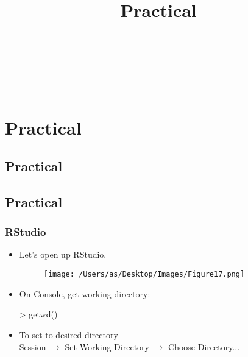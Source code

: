 \documentclass[11pt]{beamer}
\newcommand{\docYear}{\text{2022}} %
\newcommand{\aUthor}{\text{Anjali Silva}}
\newcommand{\courseCodeName}{\text{BCB410H1: Applied Bioinformatics }}
\begin{document}
\begin{frame}
\titlepage
\end{frame}



\title[\courseCodeName\docYear]{Practical}
\author[\aUthor]{}
\date{\vspace{0.5cm} \\ \\
\\
\\ \vspace{0.5cm} } 

\section{Practical}
\subsection{Practical}
\begin{frame}
\titlepage
\end{frame}


\subsection{Practical}
\begin{frame}
\frametitle{{\sf R}Studio}
\begin{itemize}
\item Let's open up RStudio. 
\vspace{0.1in}
\begin{center}
\begin{figure}
\texttt{[image: /Users/as/Desktop/Images/Figure17.png]}
\end{figure}
\end{center} 
\item On Console, get working directory:
\begin{semiverbatim}
> getwd()
\end{semiverbatim}
\vspace{0.1in}
\item {To set to desired directory \\
Session $\rightarrow$ Set Working Directory  $\rightarrow$  Choose Directory...}
\end{itemize}
\end{frame}
\end{document}
